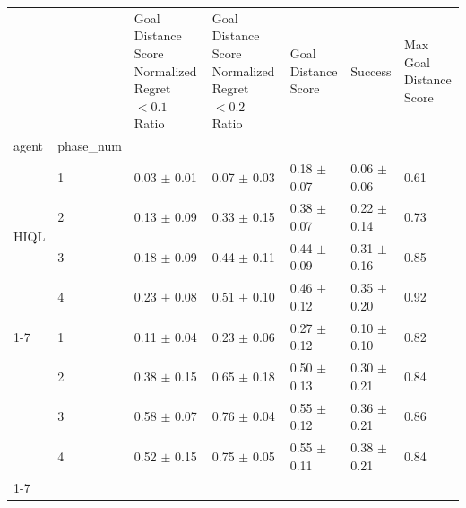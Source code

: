\begin{tabular}{lllllll}
\toprule
 &  & Goal Distance Score Normalized Regret $< 0.1$ Ratio & Goal Distance Score Normalized Regret $< 0.2$ Ratio & Goal Distance Score & Success & Max Goal Distance Score \\
agent & phase_num &  &  &  &  &  \\
\midrule
\multirow[t]{4}{*}{HIQL} & 1 & 0.03 $\pm$ 0.01 & 0.07 $\pm$ 0.03 & 0.18 $\pm$ 0.07 & 0.06 $\pm$ 0.06 & 0.61 \\
 & 2 & 0.13 $\pm$ 0.09 & 0.33 $\pm$ 0.15 & 0.38 $\pm$ 0.07 & 0.22 $\pm$ 0.14 & 0.73 \\
 & 3 & 0.18 $\pm$ 0.09 & 0.44 $\pm$ 0.11 & 0.44 $\pm$ 0.09 & 0.31 $\pm$ 0.16 & 0.85 \\
 & 4 & 0.23 $\pm$ 0.08 & 0.51 $\pm$ 0.10 & 0.46 $\pm$ 0.12 & 0.35 $\pm$ 0.20 & 0.92 \\
\cline{1-7}
\multirow[t]{4}{*}{QRL} & 1 & 0.11 $\pm$ 0.04 & 0.23 $\pm$ 0.06 & 0.27 $\pm$ 0.12 & 0.10 $\pm$ 0.10 & 0.82 \\
 & 2 & 0.38 $\pm$ 0.15 & 0.65 $\pm$ 0.18 & 0.50 $\pm$ 0.13 & 0.30 $\pm$ 0.21 & 0.84 \\
 & 3 & 0.58 $\pm$ 0.07 & 0.76 $\pm$ 0.04 & 0.55 $\pm$ 0.12 & 0.36 $\pm$ 0.21 & 0.86 \\
 & 4 & 0.52 $\pm$ 0.15 & 0.75 $\pm$ 0.05 & 0.55 $\pm$ 0.11 & 0.38 $\pm$ 0.21 & 0.84 \\
\cline{1-7}
\bottomrule
\end{tabular}
